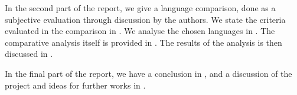 In the second part of the report, we give a language comparison, done as a subjective evaluation through discussion by the authors. We state the criteria evaluated in the comparison in . We analyse the chosen languages in . The comparative analysis itself is provided in \chapref{}. The results of the analysis is then discussed in .

In the final part of the report, we have a conclusion in , and a discussion of the project and ideas for further works in .





